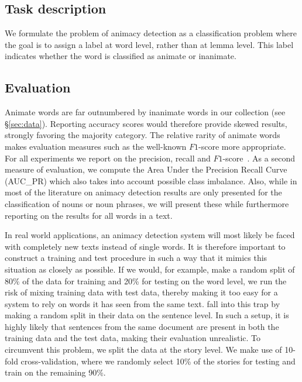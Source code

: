 \documentclass[a4paper,UKenglish]{oasics}
\begin{document}
\subsection{Task description}
We formulate the problem of animacy detection as a classification
problem where the goal is to assign a label at word level, rather than
at lemma level. This label indicates whether the word is classified as
animate or inanimate.

\subsection{Evaluation}

Animate words are far outnumbered by inanimate words in our collection
(see \S\ref{sec:data}). Reporting accuracy scores would therefore
provide skewed results, strongly favoring the majority category. The
relative rarity of animate words makes evaluation measures such as the
well-known $F1$-score more appropriate. For all experiments we report
on the precision, recall and $F1$-score~\cite{rijsbergen:79}. As a
second measure of evaluation, we compute the Area Under the Precision
Recall Curve (AUC_{PR}) which also takes into account possible class
imbalance. Also, while in most of the literature on animacy detection
results are only presented for the classification of nouns or noun
phrases, we will present these while furthermore reporting on the
results for all words in a text.

In real world applications, an animacy detection system will most
likely be faced with completely new texts instead of single words. It
is therefore important to construct a training and test procedure in
such a way that it mimics this situation as closely as possible. If we
would, for example, make a random split of 80\% of the data for
training and 20\% for testing on the word level, we run the risk of
mixing training data with test data, thereby making it too easy for a
system to rely on words it has seen from the same
text. \cite{bowman:12} fall into this trap by making a random split in
their data on the sentence level. In such a setup, it is highly likely
that sentences from the same document are present in both the training
data and the test data, making their evaluation unrealistic. To
circumvent this problem, we split the data at the story level. We make
use of 10-fold cross-validation, where we randomly select 10\% of the
stories for testing and train on the remaining 90\%.
\end{document}
